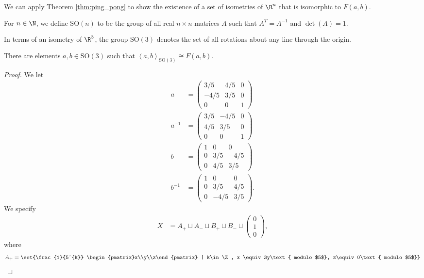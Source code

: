 We can apply Theorem \ref{thm:ping_pong} to show the existence of a set of isometries of $\R^n$ that is isomorphic to $F(a,b)$.
\begin{definition}
  For $n\in \N$, we define $\text{SO}(n)$ to be the group of all real $n\times n$ matrices $A$ such that $A^{T} = A^{-1}$ and $\det(A) = 1$.
\end{definition}
In terms of an isometry of $\R^3$, the group $\text{SO}(3)$ denotes the set of all rotations about any line through the origin.
\begin{theorem}\label{thm:free_group_so3}
  There are elements $a,b\in \text{SO}(3)$ such that $\left\langle a,b \right\rangle_{\text{SO}(3)} \cong F(a,b)$.
\end{theorem}
\begin{proof}
  We let
  \begin{align*}
    a &= \begin{pmatrix}3/5 & 4/5 & 0 \\ -4/5 & 3/5 & 0 \\ 0 & 0 & 1\end{pmatrix}\\
    a^{-1} &= \begin{pmatrix}3/5 & -4/5 & 0 \\ 4/5 & 3/5 & 0 \\ 0 & 0 & 1\end{pmatrix}\\
    b &= \begin{pmatrix}1 & 0 & 0 \\ 0 & 3/5 & -4/5 \\ 0 & 4/5 & 3/5\end{pmatrix}\\
    b^{-1} &= \begin{pmatrix}1 & 0 & 0 \\ 0 & 3/5 & 4/5 \\ 0 & -4/5 & 3/5\end{pmatrix}.
  \end{align*}
  We specify
  \begin{align*}
    X &= A_{+} \sqcup A_{-} \sqcup B_{+} \sqcup B_{-} \sqcup \begin{pmatrix}0\\1\\0\end{pmatrix},
  \end{align*}
  where
  \begin{align*}
    A_{+} &= \set{\frac{1}{5^{k}} \begin{pmatrix}x\\y\\z\end{pmatrix} | k\in \Z, x \equiv 3y\text{ modulo $5$}, z\equiv0\text{ modulo $5$}}\\

\end{align*}
\end{proof}
